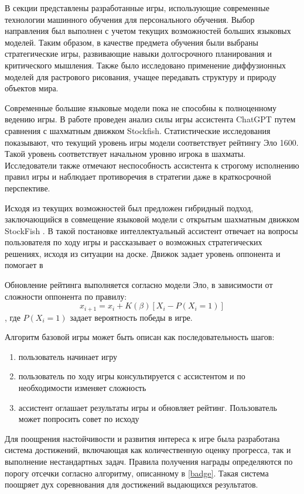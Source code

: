 В секции представлены разработанные игры, использующие современные технологии машинного обучения для 
персонального обучения. Выбор направления был выполнен с учетом текущих возможностей больших языковых моделей. 
Таким образом, в качестве предмета обучения были выбраны стратегические игры,
развивающие навыки долгосрочного планирования и критического мышления. Также 
было исследовано применение диффузионных моделей для растрового рисования, учащее передавать 
структуру и природу объектов мира.


Современные большие языковые модели пока не способны к полноценному ведению игры. В работе \cite{Adam2024} проведен анализ силы игры ассистента ChatGPT
путем сравнения с шахматным движком Stockfish. Статистические исследования показывают, что текущий уровень игры
модели соответствует рейтингу Эло 1600\cite{elo1967proposed}. Такой уровень соответствует начальном уровню игрока в шахматы. Исследователи также отмечают неспособность ассистента к строгому исполнению правил игры
и наблюдает противоречия в стратегии даже в краткосрочной перспективе.

Исходя из текущих возможностей был предложен гибридный подход, заключающийся в совмещение языковой модели с 
открытым шахматным движком StockFish \cite{acher2016large}. 
В такой постановке интеллектуальный ассистент отвечает на вопросы пользователя по ходу игры и
рассказывает о возможных стратегических решениях, исходя из ситуации на доске. 
Движок задает уровень оппонента и помогает в 

Обновление рейтинга выполняется согласно модели Эло, в зависимости от сложности оппонента по правилу:
\begin{equation}
    x_{i+1}=x_i + K(\beta) \left[X_i-P(X_i=1)\right]
\end{equation}
, где $P(X_i=1)$ задает вероятность победы в игре.

Алгоритм базовой игры может быть описан как последовательность шагов:
\begin{enumerate}
    \item пользователь начинает игру 
    \item пользователь по ходу игры консультируется с ассистентом и по необходимости изменяет сложность
    \item ассистент оглашает результаты игры и обновляет рейтинг. Пользователь может попросить совет по исходу 
\end{enumerate}

Для поощрения настойчивости и развития интереса к игре была разработана
система достижений, включающая как количественную оценку прогресса, так и выполнение нестандартных задач.
Правила получения награды определяются по порогу отсечки согласно алгоритму, описанному в \ref{badge}.
Такая система поощряет дух соревнования для достижений выдающихся результатов.

